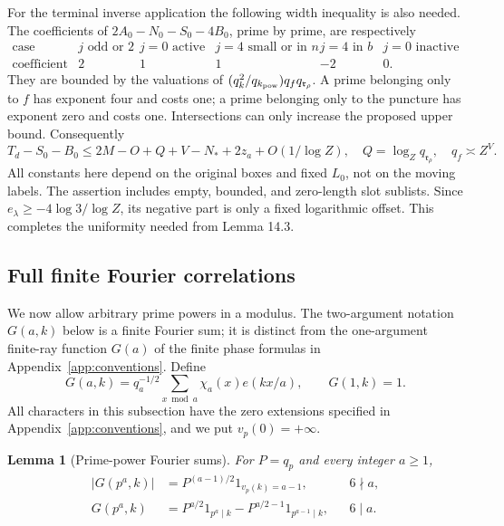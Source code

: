 \documentclass[12pt]{article}
\newtheorem{lemma}[theorem]{Lemma}
\begin{document}
For the terminal inverse application the following width inequality
is also needed.  The coefficients of
\(2A_0-N_0-S_0-4B_0\), prime by prime, are respectively
\[
 \begin{array}{c|ccccc}
 \text{case}&j\text{ odd or }2&j=0\text{ active}
  &j=4\text{ small or in }n&j=4\text{ in }b&j=0\text{ inactive}\\ \hline
 \text{coefficient}&2&1&1&-2&0 .
 \end{array}
\]
They are bounded by the valuations of
\((q_k^2/q_{k_{\rm pow}})q_fq_{\mathfrak r_\rho}\).
A prime belonging only to \(f\) has exponent four and costs one;
a prime belonging only to the puncture has exponent zero and
costs one.  Intersections can only increase the proposed upper
bound.  Consequently
\[
 T_d-S_0-B_0
       \le2M-O+Q+V-N_*+2z_a+O(1/\log Z),
 \quad Q=\log_Zq_{\mathfrak r_\rho},\quad q_f\asymp Z^V .
 \tag{C9}\label{eq:width-verified}
\]
All constants here depend on the original boxes and fixed \(L_0\),
not on the moving labels.
The assertion includes empty, bounded, and zero-length slot
sublists.  Since \(e_\lambda\ge-4\log3/\log Z\), its negative
part is only a fixed logarithmic offset.
This completes the uniformity needed from Lemma 14.3.

\subsection{Full finite Fourier correlations}\label{sec:finite-correlations}\label{app:gram}

We now allow arbitrary prime powers in a modulus.  The two-argument notation
$G(a,k)$ below is a finite Fourier sum; it is distinct from the one-argument
finite-ray function $G(a)$ of the finite phase formulas in Appendix~\ref{app:conventions}.  Define
\begin{equation}
 G(a,k)=q_a^{-1/2}\sum_{x\bmod a}\chi_a(x)e(kx/a),\qquad G(1,k)=1.
 \label{old-eq:2.4}
\end{equation}
All characters in this subsection have the zero extensions specified in
Appendix~\ref{app:conventions},
and we put $v_p(0)=+\infty$.

\begin{lemma}[Prime-power Fourier sums]\label{lem:prime-power-fourier}
For $P=q_p$ and every integer $a\ge1$,
\begin{equation}
 \begin{aligned}
 |G(p^a,k)|&=P^{(a-1)/2}1_{v_p(k)=a-1},&&6\nmid a,\\
 G(p^a,k)&=P^{a/2}1_{p^a\mid k}
             -P^{a/2-1}1_{p^{a-1}\mid k},&&6\mid a.
 \end{aligned}
 \label{eq:gauss-local}
\end{equation}
\end{lemma}
\end{document}
